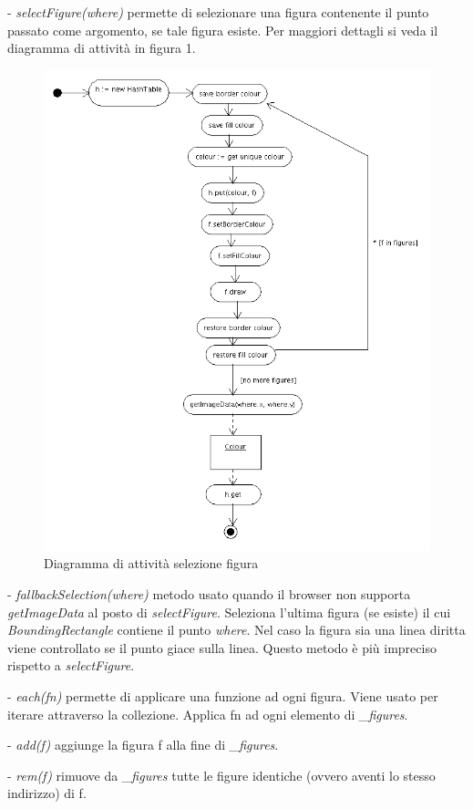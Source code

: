 \begin{elencopuntato}[\subsubsecindent]
\item[-]  \textit{selectFigure(where)} permette di selezionare una figura contenente il punto passato come argomento, se tale figura esiste. Per maggiori dettagli si veda il diagramma di attivit\`a in figura 1.

\begin{figure}[!ht]
\centering
\includegraphics[scale=0.5]{defaultselection.png}
\caption{Diagramma di attivit\`a selezione figura}
\end{figure}

\item[-] \textit{fallbackSelection(where)} metodo usato quando il browser non supporta \textit{getImageData} al posto di \textit{selectFigure}. Seleziona l'ultima figura (se esiste) il cui \textit{BoundingRectangle} contiene il punto \textit{where}. Nel caso la figura sia una linea diritta viene controllato se il punto giace sulla linea. Questo metodo \`e pi\`u impreciso rispetto a \textit{selectFigure}.
\item[-]  \textit{each(fn)} permette di applicare una funzione ad ogni figura. Viene usato per iterare attraverso la collezione. Applica fn ad ogni elemento di \textit{{\_}figures}. 
\item[-]  \textit{add(f)} aggiunge la figura f alla fine di \textit{{\_}figures}.
\item[-]  \textit{rem(f)} rimuove da \textit{{\_}figures} tutte le figure identiche (ovvero aventi lo stesso indirizzo) di f.
\end{elencopuntato}


